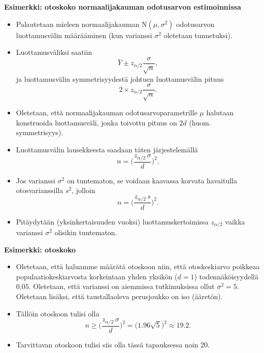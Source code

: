 \documentclass[
]{book}
\begin{document}
\hfill\break

\begin{eblock}{}

\textbf{Esimerkki: otoskoko normaalijakauman odotusarvon estimoinnissa}

\begin{itemize}
\item
  Palautetaan mieleen normaalijakauman \(\text{N}(\mu,\sigma^2)\) odotusarvon luottamusvälin määrääminen (kun varianssi \(\sigma^2\) oletetaan tunnetuksi).
\item
  Luottamusväliksi saatiin
  \[
  \bar{Y} \pm z_{\alpha/2} \frac{\sigma}{\sqrt{n}},
  \]
  ja luottamusvälin symmetrisyydestä johtuen luottamusvälin pituus
  \[
  2 \times z_{\alpha/2} \frac{\sigma}{\sqrt{n}}.
  \]
\item
  Oletetaan, että normaalijakauman odotusarvoparametrille \(\mu\) halutaan konstruoida luottamusväli, jonka toivottu pituus on \(2d\) (huom. symmetrisyys).
\item
  Luottamusvälin lausekkeesta saadaan täten järjestelemällä
  \[
  n = \Big(\frac{z_{\alpha/2} \, \sigma}{d} \Big)^2.
  \]
\item
  Jos varianssi \(\sigma^2\) on tuntematon, se voidaan kaavassa korvata havaitulla otosvarianssilla \(s^2\), jolloin
  \[
  n = \Big(\frac{z_{\alpha/2} \, s}{d} \Big)^2.
  \]
\item
  Pitäydytään (yksinkertaisuuden vuoksi) luottamuskertoimissa \(z_{\alpha/2}\) vaikka varianssi \(\sigma^2\) olisikin tuntematon.
\end{itemize}

\end{eblock}

\begin{eblock}{}

\textbf{Esimerkki: otoskoko}

\begin{itemize}
\item
  Oletetaan, että haluamme määrätä otoskoon niin, että otoskeskiarvo poikkeaa populaatiokeskiarvosta korkeintaan yhden yksikön (\(d = 1\)) todennäköisyydellä \(0.05\). Oletetaan, että varianssi on aiemmissa tutkimuksissa ollut \(\sigma^2 = 5\). Oletetaan lisäksi, että taustallaoleva perusjoukko on iso (ääretön).
\item
  Tällöin otoskoon tulisi olla
  \[
  n \ge \Big(\frac{z_{\alpha/2} \, \sigma}{d} \Big)^2 = \Big(1.96 \sqrt{5} \Big)^2 \approx 19.2.
  \]
\item
  Tarvittavan otoskoon tulisi siis olla tässä tapauksessa noin 20.
\end{itemize}

\end{eblock}
\end{document}
